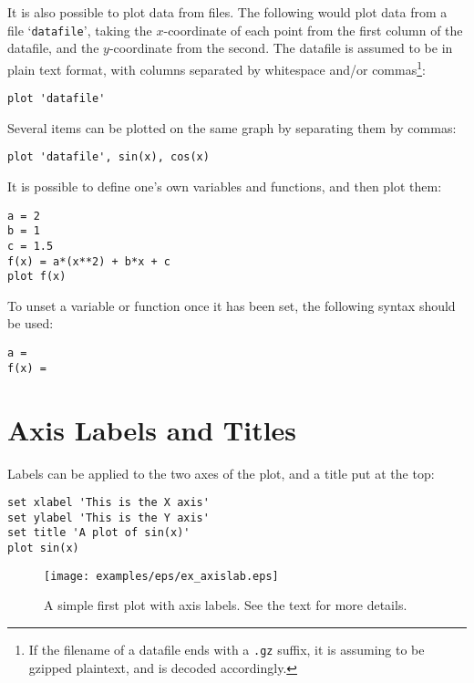 \documentclass[a4paper,onecolumn,11pt]{book}
\begin{document}
\noindent It is also possible to plot data from files. The following would plot
data from a file `\texttt{datafile}', taking the $x$-coordinate of each point
from the first column of the datafile, and the $y$-coordinate from the second.
The datafile is assumed to be in plain text format, with columns separated by
whitespace and/or commas\footnote{If the filename of a datafile ends with a
\texttt{.gz} suffix, it is assuming to be gzipped plaintext, and is decoded
accordingly.}:

\begin{verbatim}
plot 'datafile'
\end{verbatim}

Several items can be plotted on the same graph by separating them by commas:

\begin{verbatim}
plot 'datafile', sin(x), cos(x)
\end{verbatim}

\noindent It is possible to define one's own variables and functions, and then
plot them:

\begin{verbatim}
a = 2
b = 1
c = 1.5
f(x) = a*(x**2) + b*x + c
plot f(x)
\end{verbatim}

\noindent To unset a variable or function once it has been set, the following
syntax should be
used:

\begin{verbatim}
a =
f(x) =
\end{verbatim}

\section{Axis Labels and Titles}
\label{sec:latex_incompatibility}

Labels can be applied to the two axes of the plot, and a title put at the top:

\begin{verbatim}
set xlabel 'This is the X axis'
set ylabel 'This is the Y axis'
set title 'A plot of sin(x)'
plot sin(x)
\end{verbatim}

\begin{figure}
\begin{center}
\texttt{[image: examples/eps/ex\_axislab.eps]}
\end{center}
\caption{A simple first plot with axis labels. See the text for more details.}
\label{fig:ex_axislab}
\end{figure}
\end{document}
